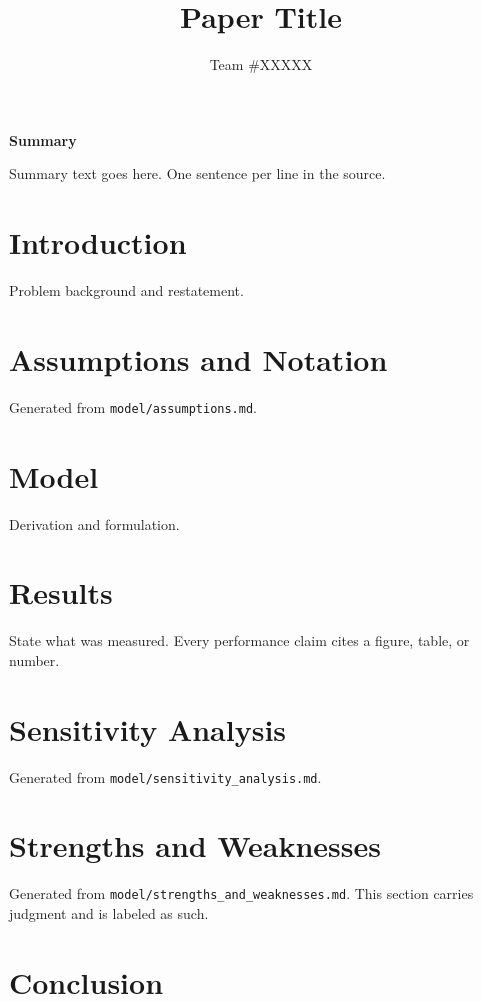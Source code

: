 \documentclass[11pt]{article}
\title{Paper Title}
\author{Team \#XXXXX}
\date{}
\begin{document}
\begin{center}
  {\Large\bfseries Summary}
\end{center}
\noindent
Summary text goes here.
One sentence per line in the source.

\newpage
\tableofcontents
\newpage

\section{Introduction}
Problem background and restatement.

\section{Assumptions and Notation}
Generated from \texttt{model/assumptions.md}.

\section{Model}
Derivation and formulation.

\section{Results}
State what was measured.
Every performance claim cites a figure, table, or number.

\section{Sensitivity Analysis}
Generated from \texttt{model/sensitivity\_analysis.md}.

\section{Strengths and Weaknesses}
Generated from \texttt{model/strengths\_and\_weaknesses.md}.
This section carries judgment and is labeled as such.

\section{Conclusion}



\end{document}
